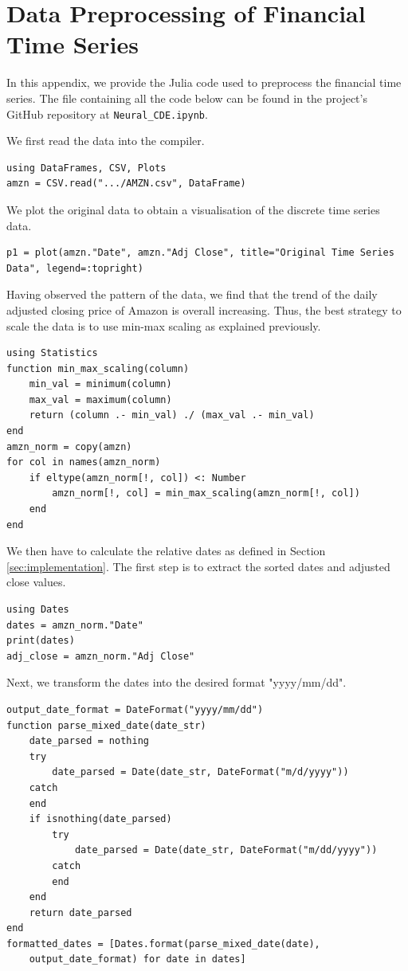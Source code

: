 \documentclass[a4paper,11pt,titlepage]{article}
\theoremstyle{definition}
\theoremstyle{plain}
\theoremstyle{remark}
\begin{document}
\section{Data Preprocessing of Financial Time Series}
\label{sec:datatime}

In this appendix, we provide the Julia code used to preprocess the financial time series. The file containing all the code below can be found in the project's GitHub repository at \verb|Neural_CDE.ipynb|.

We first read the data into the compiler.
\begin{verbatim}
using DataFrames, CSV, Plots
amzn = CSV.read(".../AMZN.csv", DataFrame)
\end{verbatim}

We plot the original data to obtain a visualisation of the discrete time series data.
\begin{verbatim}
p1 = plot(amzn."Date", amzn."Adj Close", title="Original Time Series
Data", legend=:topright)
\end{verbatim}

Having observed the pattern of the data, we find that the trend of the daily adjusted closing price of Amazon is overall increasing. Thus, the best strategy to scale the data is to use min-max scaling as explained previously.
\begin{verbatim}
using Statistics
function min_max_scaling(column)
    min_val = minimum(column)
    max_val = maximum(column)
    return (column .- min_val) ./ (max_val .- min_val)
end
amzn_norm = copy(amzn)
for col in names(amzn_norm)
    if eltype(amzn_norm[!, col]) <: Number
        amzn_norm[!, col] = min_max_scaling(amzn_norm[!, col])
    end
end
\end{verbatim}

We then have to calculate the relative dates as defined in Section \ref{sec:implementation}. The first step is to extract the sorted dates and adjusted close values. 
\begin{verbatim}
using Dates
dates = amzn_norm."Date"
print(dates)
adj_close = amzn_norm."Adj Close"
\end{verbatim}

Next, we transform the dates into the desired format "yyyy/mm/dd".
\begin{verbatim}
output_date_format = DateFormat("yyyy/mm/dd")
function parse_mixed_date(date_str)
    date_parsed = nothing
    try
        date_parsed = Date(date_str, DateFormat("m/d/yyyy"))
    catch
    end
    if isnothing(date_parsed)
        try
            date_parsed = Date(date_str, DateFormat("m/dd/yyyy"))
        catch
        end
    end
    return date_parsed
end
formatted_dates = [Dates.format(parse_mixed_date(date), 
    output_date_format) for date in dates]
\end{verbatim}
\end{document}
